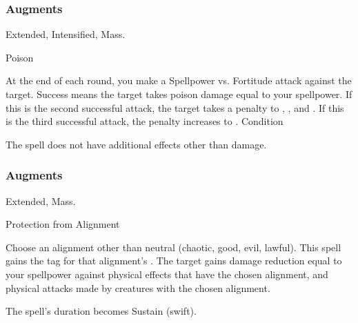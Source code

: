 \subsubsection{Augments}
 Extended, Intensified, Mass.
\begin{spellsection}{Poison}
\begin{spellheader}
\end{spellheader}
\begin{spellcontent}
\begin{spelltargetinginfo}
\end{spelltargetinginfo}
\begin{spelleffects}
\spelleffect
At the end of each round, you make a Spellpower vs. Fortitude attack against the target.
Success means the target takes poison damage equal to your spellpower.
If this is the second successful attack, the target takes a  penalty to , , and .
If this is the third successful attack, the penalty increases to .
\spelldur Condition
\end{spelleffects}
\end{spellcontent}
\begin{spellfooter}
\miscastexplode
\end{spellfooter}
\begin{spellcantrip}
The spell does not have additional effects other than damage.
\end{spellcantrip}
\end{spellsection}
\subsubsection{Augments}
 Extended, Mass.
\begin{spellsection}{Protection from Alignment}
\begin{spellcontent}
\begin{spelltargetinginfo}
\end{spelltargetinginfo}
\begin{spelleffects}
\spellspecial
Choose an alignment other than neutral (chaotic, good, evil, lawful).
This spell gains the tag for that alignment's .
\spelleffect
The target gains damage reduction equal to your spellpower against physical effects that have the chosen alignment, and physical attacks made by creatures with the chosen alignment.
\end{spelleffects}
\end{spellcontent}
\begin{spellfooter}
\miscastexplode
\end{spellfooter}
\begin{spellcantrip}
The spell's duration becomes Sustain (swift).
\end{spellcantrip}
\end{spellsection}
